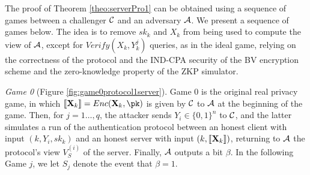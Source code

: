 The proof of Theorem \ref{theo:serverPro1} can be obtained using a sequence of games
between a challenger $\mathcal{C}$ and an adversary $\mathcal{A}$. We present a
sequence of games below. The idea is to remove $sk_k$ and $X_k$ from being used
to compute the view of $\mathcal{A}$, except for $Verify(X_k,Y_k^{j})$ queries, as
in the ideal game, relying on the correctness of the protocol and the IND-CPA
security of the BV encryption scheme and the zero-knowledge property of the ZKP
simulator.

\textit{Game 0} (Figure \ref{fig:game0protocol1server}). Game 0 is the original real privacy game, in which
$\enc{\mathbf{X}_{k}} = Enc(\mathbf{X}_{k},\pk)$ is given by $\mathcal{C}$ to
$\mathcal{A}$ at the beginning of the game. Then, for $j=1\ldots,q$, the attacker
sends $Y_i \in \{0,1\}^n$ to $\mathcal{C}$, and the latter simulates a run
of the authentication protocol between an honest client with input
$(k,Y_i, sk_k)$ and an honest server with input $(k,\left\llbracket\mathbf{X}_{k}\right\rrbracket)$, returning to
$\mathcal{A}$ the protocol's view $V^{(i)}_S$ of the server. Finally, $\mathcal{A}$
outputs a bit $\beta$. In the following Game $j$, we let $S_j$ denote the event
that $\beta=1$.

